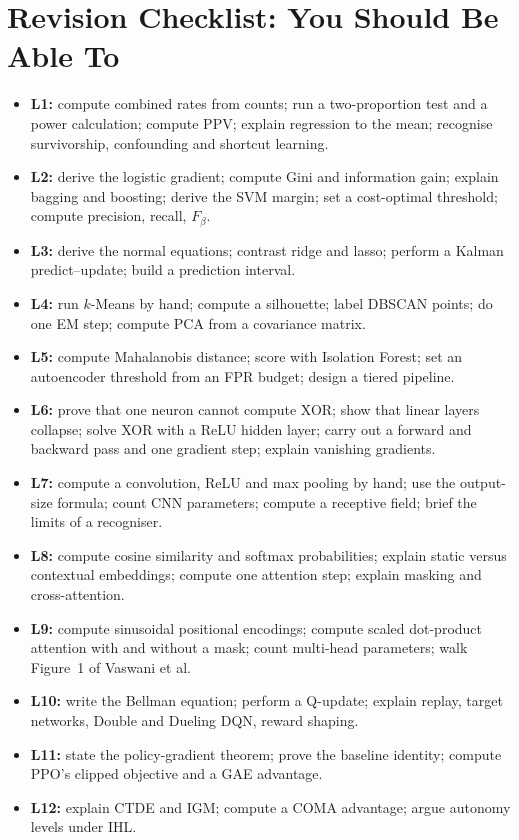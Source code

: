 \documentclass[11pt]{article}
\begin{document}
\section{Revision Checklist: You Should Be Able To}
\begin{itemize}
\item \textbf{L1:} compute combined rates from counts; run a two-proportion test and a power calculation; compute PPV; explain regression to the mean; recognise survivorship, confounding and shortcut learning.
\item \textbf{L2:} derive the logistic gradient; compute Gini and information gain; explain bagging and boosting; derive the SVM margin; set a cost-optimal threshold; compute precision, recall, $F_\beta$.
\item \textbf{L3:} derive the normal equations; contrast ridge and lasso; perform a Kalman predict--update; build a prediction interval.
\item \textbf{L4:} run $k$-Means by hand; compute a silhouette; label DBSCAN points; do one EM step; compute PCA from a covariance matrix.
\item \textbf{L5:} compute Mahalanobis distance; score with Isolation Forest; set an autoencoder threshold from an FPR budget; design a tiered pipeline.
\item \textbf{L6:} prove that one neuron cannot compute XOR; show that linear layers collapse; solve XOR with a ReLU hidden layer; carry out a forward and backward pass and one gradient step; explain vanishing gradients.
\item \textbf{L7:} compute a convolution, ReLU and max pooling by hand; use the output-size formula; count CNN parameters; compute a receptive field; brief the limits of a recogniser.
\item \textbf{L8:} compute cosine similarity and softmax probabilities; explain static versus contextual embeddings; compute one attention step; explain masking and cross-attention.
\item \textbf{L9:} compute sinusoidal positional encodings; compute scaled dot-product attention with and without a mask; count multi-head parameters; walk Figure~1 of Vaswani et al.
\item \textbf{L10:} write the Bellman equation; perform a Q-update; explain replay, target networks, Double and Dueling DQN, reward shaping.
\item \textbf{L11:} state the policy-gradient theorem; prove the baseline identity; compute PPO's clipped objective and a GAE advantage.
\item \textbf{L12:} explain CTDE and IGM; compute a COMA advantage; argue autonomy levels under IHL.
\end{itemize}
\end{document}
